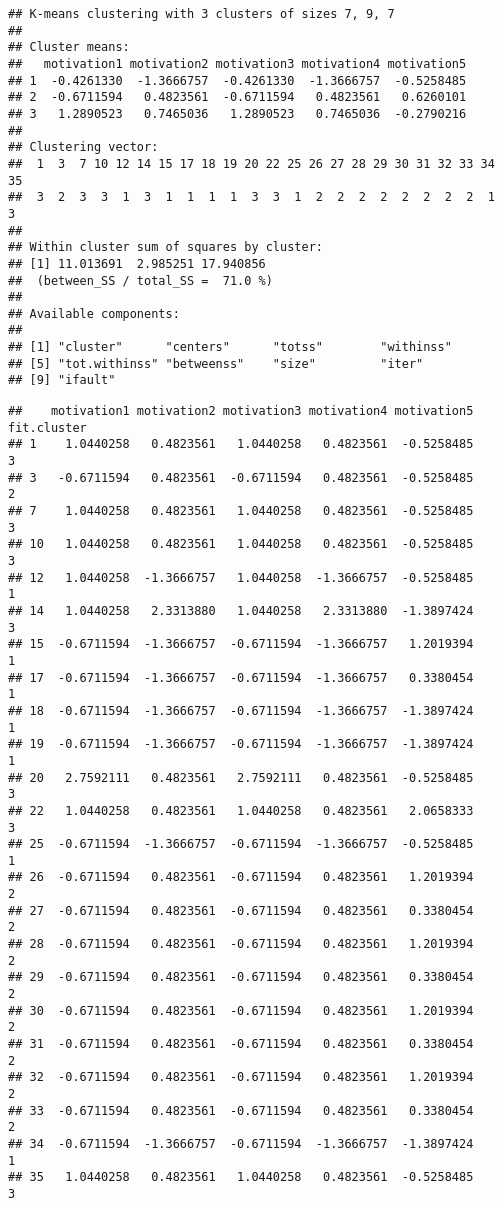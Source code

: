 \documentclass[]{article}
\newenvironment{Shaded}{\begin{snugshade}}{\end{snugshade}}
\newcommand{\KeywordTok}[1]{\textcolor[rgb]{0.13,0.29,0.53}{\textbf{#1}}}
\newcommand{\NormalTok}[1]{#1}
\newcommand{\OperatorTok}[1]{\textcolor[rgb]{0.81,0.36,0.00}{\textbf{#1}}}
\begin{document}
\begin{verbatim}
## K-means clustering with 3 clusters of sizes 7, 9, 7
## 
## Cluster means:
##   motivation1 motivation2 motivation3 motivation4 motivation5
## 1  -0.4261330  -1.3666757  -0.4261330  -1.3666757  -0.5258485
## 2  -0.6711594   0.4823561  -0.6711594   0.4823561   0.6260101
## 3   1.2890523   0.7465036   1.2890523   0.7465036  -0.2790216
## 
## Clustering vector:
##  1  3  7 10 12 14 15 17 18 19 20 22 25 26 27 28 29 30 31 32 33 34 35 
##  3  2  3  3  1  3  1  1  1  1  3  3  1  2  2  2  2  2  2  2  2  1  3 
## 
## Within cluster sum of squares by cluster:
## [1] 11.013691  2.985251 17.940856
##  (between_SS / total_SS =  71.0 %)
## 
## Available components:
## 
## [1] "cluster"      "centers"      "totss"        "withinss"    
## [5] "tot.withinss" "betweenss"    "size"         "iter"        
## [9] "ifault"
\end{verbatim}

\begin{Shaded}
\end{Shaded}

\begin{verbatim}
##    motivation1 motivation2 motivation3 motivation4 motivation5 fit.cluster
## 1    1.0440258   0.4823561   1.0440258   0.4823561  -0.5258485           3
## 3   -0.6711594   0.4823561  -0.6711594   0.4823561  -0.5258485           2
## 7    1.0440258   0.4823561   1.0440258   0.4823561  -0.5258485           3
## 10   1.0440258   0.4823561   1.0440258   0.4823561  -0.5258485           3
## 12   1.0440258  -1.3666757   1.0440258  -1.3666757  -0.5258485           1
## 14   1.0440258   2.3313880   1.0440258   2.3313880  -1.3897424           3
## 15  -0.6711594  -1.3666757  -0.6711594  -1.3666757   1.2019394           1
## 17  -0.6711594  -1.3666757  -0.6711594  -1.3666757   0.3380454           1
## 18  -0.6711594  -1.3666757  -0.6711594  -1.3666757  -1.3897424           1
## 19  -0.6711594  -1.3666757  -0.6711594  -1.3666757  -1.3897424           1
## 20   2.7592111   0.4823561   2.7592111   0.4823561  -0.5258485           3
## 22   1.0440258   0.4823561   1.0440258   0.4823561   2.0658333           3
## 25  -0.6711594  -1.3666757  -0.6711594  -1.3666757  -0.5258485           1
## 26  -0.6711594   0.4823561  -0.6711594   0.4823561   1.2019394           2
## 27  -0.6711594   0.4823561  -0.6711594   0.4823561   0.3380454           2
## 28  -0.6711594   0.4823561  -0.6711594   0.4823561   1.2019394           2
## 29  -0.6711594   0.4823561  -0.6711594   0.4823561   0.3380454           2
## 30  -0.6711594   0.4823561  -0.6711594   0.4823561   1.2019394           2
## 31  -0.6711594   0.4823561  -0.6711594   0.4823561   0.3380454           2
## 32  -0.6711594   0.4823561  -0.6711594   0.4823561   1.2019394           2
## 33  -0.6711594   0.4823561  -0.6711594   0.4823561   0.3380454           2
## 34  -0.6711594  -1.3666757  -0.6711594  -1.3666757  -1.3897424           1
## 35   1.0440258   0.4823561   1.0440258   0.4823561  -0.5258485           3
\end{verbatim}
\end{document}
